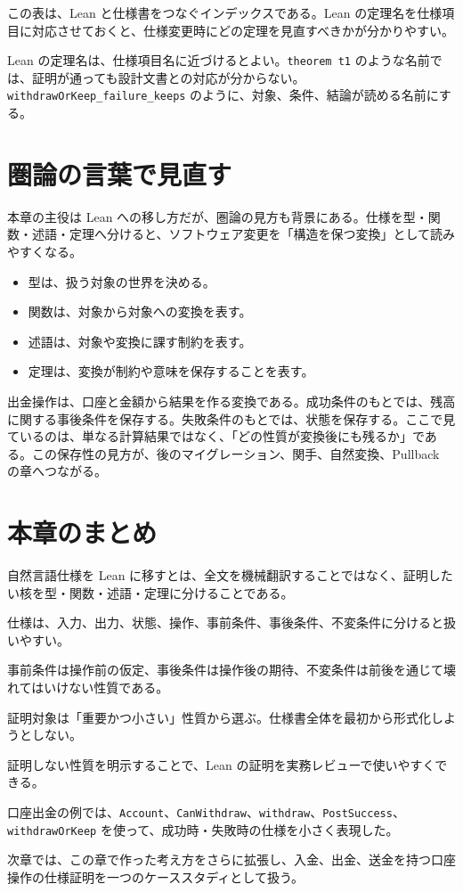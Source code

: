 この表は、Lean と仕様書をつなぐインデックスである。Lean の定理名を仕様項目に対応させておくと、仕様変更時にどの定理を見直すべきかが分かりやすい。

\begin{leanbox}
Lean の定理名は、仕様項目名に近づけるとよい。\texttt{theorem t1} のような名前では、証明が通っても設計文書との対応が分からない。\texttt{withdrawOrKeep\_failure\_keeps} のように、対象、条件、結論が読める名前にする。
\end{leanbox}

\section{圏論の言葉で見直す}

本章の主役は Lean への移し方だが、圏論の見方も背景にある。仕様を型・関数・述語・定理へ分けると、ソフトウェア変更を「構造を保つ変換」として読みやすくなる。

\begin{itemize}
\item 型は、扱う対象の世界を決める。
\item 関数は、対象から対象への変換を表す。
\item 述語は、対象や変換に課す制約を表す。
\item 定理は、変換が制約や意味を保存することを表す。
\end{itemize}

出金操作は、口座と金額から結果を作る変換である。成功条件のもとでは、残高に関する事後条件を保存する。失敗条件のもとでは、状態を保存する。ここで見ているのは、単なる計算結果ではなく、「どの性質が変換後にも残るか」である。この保存性の見方が、後のマイグレーション、関手、自然変換、Pullback の章へつながる。

\section{本章のまとめ}

自然言語仕様を Lean に移すとは、全文を機械翻訳することではなく、証明したい核を型・関数・述語・定理に分けることである。

仕様は、入力、出力、状態、操作、事前条件、事後条件、不変条件に分けると扱いやすい。

事前条件は操作前の仮定、事後条件は操作後の期待、不変条件は前後を通じて壊れてはいけない性質である。

証明対象は「重要かつ小さい」性質から選ぶ。仕様書全体を最初から形式化しようとしない。

証明しない性質を明示することで、Lean の証明を実務レビューで使いやすくできる。

口座出金の例では、\texttt{Account}、\texttt{CanWithdraw}、\texttt{withdraw}、\texttt{PostSuccess}、\texttt{withdrawOrKeep} を使って、成功時・失敗時の仕様を小さく表現した。

次章では、この章で作った考え方をさらに拡張し、入金、出金、送金を持つ口座操作の仕様証明を一つのケーススタディとして扱う。
